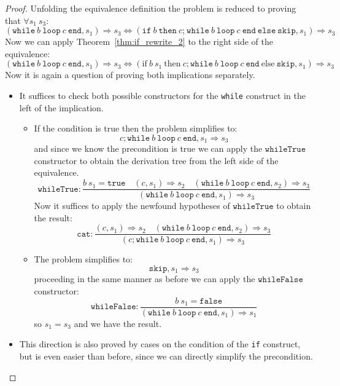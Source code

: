 \documentclass[
  a4paper, 
  10pt, 
  parskip=half, 
  DIV=20,
  toc=bibliography,
  usegeometry,
]{scrartcl}
\renewcommand{\implies}{\rightarrow}
\renewcommand{\impliedby}{\leftarrow}
\newcommand{\bigstep}{\Longrightarrow}
\begin{document}
\begin{proof}
  Unfolding the equivalence definition the problem is reduced to proving that
  \(\forall s_1 \ s_3\):
  \[
    (\texttt{while} \ b \ \texttt{loop} \ c \ \texttt{end}, s_1) \bigstep s_3 \iff
    (\texttt{if} \ b \ \texttt{then} \ c \texttt{;} \ \texttt{while} \ b \ \texttt{loop} \ c \ \texttt{end} \ \texttt{else} \ \texttt{skip}, s_1) \bigstep s_3
  \]
  Now we can apply Theorem~\ref{thm:if_rewrite_2} to the right side of the equivalence:
  \[
    (\texttt{while} \ b \ \texttt{loop} \ c \ \texttt{end}, s_1) \bigstep s_3 \iff
    (\text{if} \ b \ s_1 \ \text{then} \ c; \texttt{while} \ b \ \texttt{loop} \ c \ \texttt{end} \ \text{else} \ \texttt{skip}, s_1) \bigstep s_3
  \]
  Now it is again a question of proving both implications separately.
  \begin{itemize}
    \item[(\(\implies\))] It suffices to check both possible constructors for
    the \texttt{while} construct in the left of the implication.
    \begin{itemize}
      \item[(\(b \ s_1\))]
      If the condition is true then the problem simplifies to:
      \[
        c; \texttt{while} \ b \ \texttt{loop} \ c \ \texttt{end}, s_1 \bigstep s_3
      \]
      and since we know the precondition is true we can apply the \(\texttt{whileTrue}\) constructor
      to obtain the derivation tree from the left side of the equivalence.
      \[
        \texttt{whileTrue}: \frac{
          b \ s_1 = \texttt{true}
          \quad
          (c, s_1) \bigstep s_2 
          \quad 
          (\texttt{while} \ b \ \texttt{loop} \ c \ \texttt{end}, s_2) \bigstep s_3
        }{
          (\texttt{while} \ b \ \texttt{loop} \ c \ \texttt{end}, s_1) \bigstep s_3
        }
      \]
      Now it suffices to apply the newfound hypotheses of \(\texttt{whileTrue}\) to 
      obtain the result:
      \[
        \texttt{cat}: \frac{
          (c, s_1) \bigstep s_2
          \quad
          (\texttt{while} \ b \ \texttt{loop} \ c \ \texttt{end}, s_2) \bigstep s_3
        }{
          (c; \texttt{while} \ b \ \texttt{loop} \ c \ \texttt{end}, s_1) \bigstep s_3
        }
      \]
      \item[(\(\lnot b \ s_1\))] The problem simplifies to:
      \[
        \texttt{skip}, s_1 \bigstep s_3
      \]
      proceeding in the same manner as before we can apply the \(\texttt{whileFalse}\) constructor:
      \[
        \texttt{whileFalse}: \frac{
          b \ s_1 = \texttt{false}          
        }{
          (\texttt{while} \ b \ \texttt{loop} \ c \ \texttt{end}, s_1) \bigstep s_1
        }
      \]
      so \(s_1 = s_3\) and we have the result.
    \end{itemize}

    \item[(\(\impliedby\))] This direction is also proved by cases on the condition 
    of the \texttt{if} construct, but is even easier than before, since we
    can directly simplify the precondition.
  \end{itemize}
\end{proof}
\end{document}
